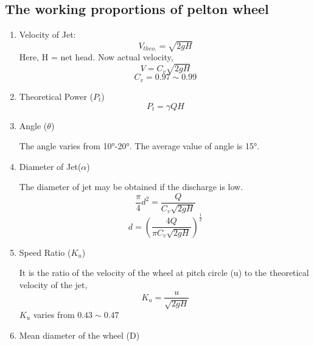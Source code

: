 \documentclass{article}
\begin{document}
\subsection*{The working proportions of pelton wheel}
\begin{enumerate}
  \item Velocity of Jet: 
  $$V_{theo.} = \sqrt{2g H}$$ Here, H = net head. Now actual velocity,
  \begin{equation}
    V = C_v \sqrt{2g H}  
    \label{eq:eq40}
  \end{equation}
$$C_v = 0.97 \sim  0.99$$

\item Theoretical Power ($P_t$)
\begin{equation}
  P_t = \gamma Q H
  \label{eq:eq41}
\end{equation}

\begin{center}
\begin{minipage}{0.5\textwidth}
    \setlength{\fboxrule}{1pt} %
    \setlength{\fboxsep}{10pt} %
  \end{minipage}
\end{center}

\item Angle ($\theta$)

The angle varies from 10°-20°. The average value of angle is 15°. 

\item Diameter of Jet($\alpha$)

The diameter of jet may be obtained if the discharge is low. 
$$\frac{\pi}{4} d^2 = \frac{Q}{C_v \sqrt{2gH}}$$
\begin{equation}
  d = \left(\frac{4Q}{\pi C_v \sqrt{2gH}}\right)^{\frac{1}{2}}
\end{equation}

\item Speed Ratio ($K_u$)

It is the ratio of the velocity of the wheel at pitch circle (u) to the theoretical velocity of the jet,
\begin{equation}
  K_u = \frac{u}{\sqrt{2gH}} \label{eq:eq43}
\end{equation}
$K_u$ varies from $0.43 \sim 0.47$ 

\item Mean diameter of the wheel (D)


\end{enumerate}
\end{document}
